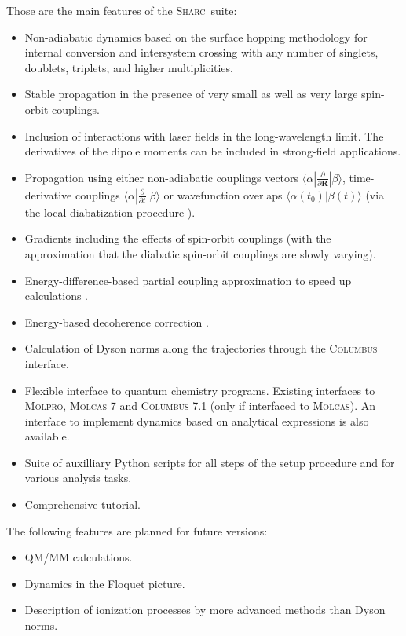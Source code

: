 \documentclass[a4paper,11pt,DIV=15,openany,twoside=false]{scrbook}
\newcommand{\sharc}{\textsc{Sharc}}
\begin{document}
Those are the main features of the \sharc\ suite:
\begin{itemize}
  \item Non-adiabatic dynamics based on the surface hopping methodology for internal conversion and intersystem crossing with any number of singlets, doublets, triplets, and higher multiplicities.
  \item Stable propagation in the presence of very small as well as very large spin-orbit couplings.
  \item Inclusion of interactions with laser fields in the long-wavelength limit. The derivatives of the dipole moments can be included in strong-field applications.
  \item Propagation using either non-adiabatic couplings vectors $\langle\alpha|\frac{\partial}{\partial \mathbf{R}}|\beta\rangle$, time-derivative couplings $\langle\alpha|\frac{\partial}{\partial t}|\beta\rangle$ or wavefunction overlaps $\langle\alpha(t_0)|\beta(t)\rangle$ (via the local diabatization procedure \cite{Granucci2007JCP}).
  \item Gradients including the effects of spin-orbit couplings (with the approximation that the diabatic spin-orbit couplings are slowly varying).
  \item Energy-difference-based partial coupling approximation to speed up calculations \cite{Pittner2009CP}.
  \item Energy-based decoherence correction \cite{Granucci2007JCP}.
  \item Calculation of Dyson norms along the trajectories through the \textsc{Columbus} interface.
  \item Flexible interface to quantum chemistry programs. Existing interfaces to \textsc{Molpro}, \textsc{Molcas 7} and \textsc{Columbus 7.1} (only if interfaced to \textsc{Molcas}). An interface to implement dynamics based on analytical expressions is also available.
  \item Suite of auxilliary Python scripts for all steps of the setup procedure and for various analysis tasks.
  \item Comprehensive tutorial.
\end{itemize}

The following features are planned for future versions:
\begin{itemize}
  \item QM/MM calculations.
  \item Dynamics in the Floquet picture.
  \item Description of ionization processes by more advanced methods than Dyson norms.
\end{itemize}
\end{document}
